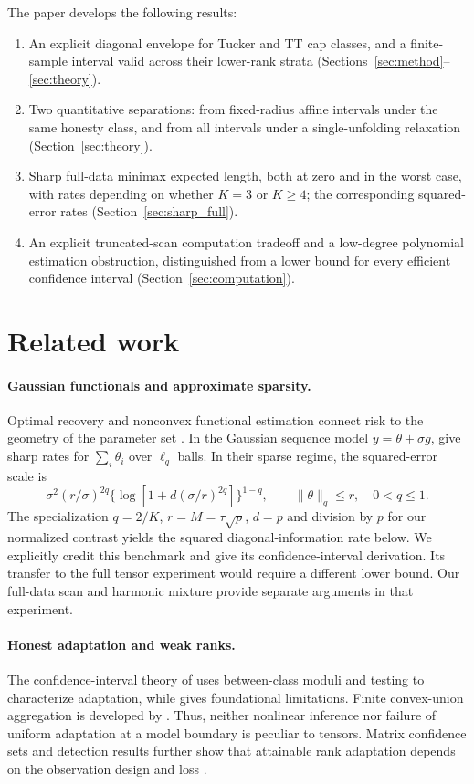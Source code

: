 \documentclass[11pt]{article}
\theoremstyle{remark}
\newcommand{\norm}[1]{\lVert #1\rVert}
\begin{document}
The paper develops the following results:
\begin{enumerate}
\item An explicit diagonal envelope for Tucker and TT cap classes, and a finite-sample interval valid across their lower-rank strata (Sections~\ref{sec:method}--\ref{sec:theory}).
\item Two quantitative separations: from fixed-radius affine intervals under the same honesty class, and from all intervals under a single-unfolding relaxation (Section~\ref{sec:theory}).
\item Sharp full-data minimax expected length, both at zero and in the worst case, with rates depending on whether $K=3$ or $K\ge4$; the corresponding squared-error rates (Section~\ref{sec:sharp_full}).
\item An explicit truncated-scan computation tradeoff and a low-degree polynomial estimation obstruction, distinguished from a lower bound for every efficient confidence interval (Section~\ref{sec:computation}).
\end{enumerate}

\section{Related work}\label{sec:related}

\paragraph{Gaussian functionals and approximate sparsity.}
Optimal recovery and nonconvex functional estimation connect risk to the geometry of the parameter set \citep{donoho1994,cailownonconvex2004}. In the Gaussian sequence model $y=\theta+\sigma g$, \citet{collier2017} give sharp rates for $\sum_i\theta_i$ over $\ell_q$ balls. In their sparse regime, the squared-error scale is
\[
 \sigma^2(r/\sigma)^{2q}
 \{\log[1+d(\sigma/r)^{2q}]\}^{1-q},
 \qquad \norm\theta_q\le r,\quad 0<q\le1.
\]
The specialization $q=2/K$, $r=M=\tau\sqrt p$, $d=p$ and division by $p$ for our normalized contrast yields the squared diagonal-information rate below. We explicitly credit this benchmark and give its confidence-interval derivation. Its transfer to the full tensor experiment would require a different lower bound. Our full-data scan and harmonic mixture provide separate arguments in that experiment.

\paragraph{Honest adaptation and weak ranks.}
The confidence-interval theory of \citet{cailow2004} uses between-class moduli and testing to characterize adaptation, while \citet{low1997} gives foundational limitations. Finite convex-union aggregation is developed by \citet{juditskynemirovski2020}. Thus, neither nonlinear inference nor failure of uniform adaptation at a model boundary is peculiar to tensors. Matrix confidence sets and detection results further show that attainable rank adaptation depends on the observation design and loss \citep{carpentieretal2018,carpentiernickl2015}.
\end{document}
